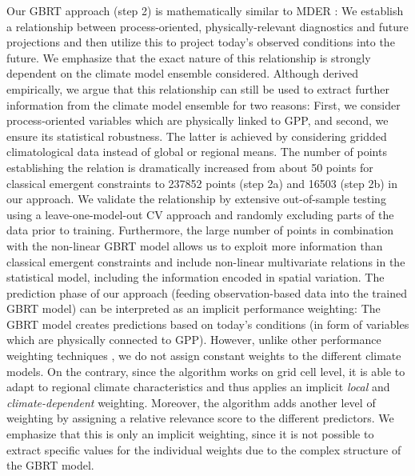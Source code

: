 Our \ac{GBRT} approach (step 2) is mathematically similar to \ac{MDER}
\autocite{Karpechko2013, Senftleben2020, Wenzel2016a}: We establish a
relationship between process-oriented, physically-relevant diagnostics and
future projections and then utilize this to project today's observed conditions
into the future. We emphasize that the exact nature of this relationship is
strongly dependent on the climate model ensemble considered. Although derived
empirically, we argue that this relationship can still be used to extract
further information from the climate model ensemble for two reasons: First, we
consider process-oriented variables which are physically linked to \ac{GPP},
and second, we ensure its statistical robustness. The latter is achieved by
considering gridded climatological data instead of global or regional means.
The number of points establishing the relation is dramatically increased from
about 50 points for classical emergent constraints to 237852 points (step 2a)
and 16503 (step 2b) in our approach. We validate the relationship by extensive
out-of-sample testing using a leave-one-model-out \ac{CV} approach and randomly
excluding parts of the data prior to training. Furthermore, the large number of
points in combination with the non-linear \ac{GBRT} model allows us to exploit
more information than classical emergent constraints and include non-linear
multivariate relations in the statistical model, including the information
encoded in spatial variation. The prediction phase of our approach (feeding
observation-based data into the trained \ac{GBRT} model) can be interpreted as
an implicit performance weighting: The \ac{GBRT} model creates predictions
based on today's conditions (in form of variables which are physically
connected to \ac{GPP}). However, unlike other performance weighting techniques
\autocite{Knutti2017a, Sanderson2017}, we do not assign constant weights to the
different climate models. On the contrary, since the algorithm works on grid
cell level, it is able to adapt to regional climate characteristics and thus
applies an implicit \emph{local} and \emph{climate-dependent} weighting.
Moreover, the algorithm adds another level of weighting by assigning a relative
relevance score to the different predictors. We emphasize that this is only an
implicit weighting, since it is not possible to extract specific values for the
individual weights due to the complex structure of the \ac{GBRT} model.

